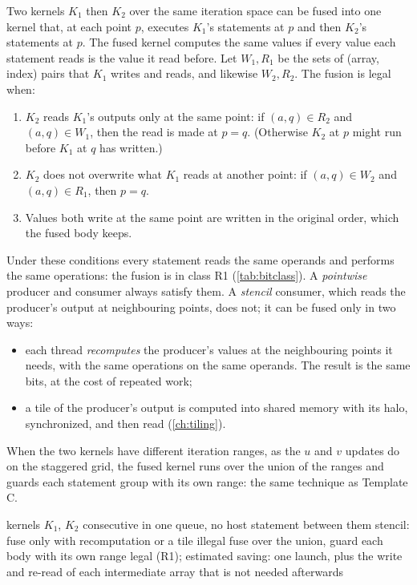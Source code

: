 Two kernels $K_1$ then $K_2$ over the same iteration space can be fused into one kernel that, at each point $p$,
executes $K_1$'s statements at $p$ and then $K_2$'s statements at $p$. The fused kernel computes the same values if
every value each statement reads is the value it read before. Let $W_1, R_1$ be the sets of (array, index) pairs that
$K_1$ writes and reads, and likewise $W_2, R_2$. The fusion is legal when:
\begin{enumerate}
  \item $K_2$ reads $K_1$'s outputs only at the same point: if $(a, q) \in R_2$ and $(a, q) \in W_1$, then the read
    is made at $p = q$. (Otherwise $K_2$ at $p$ might run before $K_1$ at $q$ has written.)
  \item $K_2$ does not overwrite what $K_1$ reads at another point: if $(a, q) \in W_2$ and $(a, q) \in R_1$, then
    $p = q$.
  \item Values both write at the same point are written in the original order, which the fused body keeps.
\end{enumerate}
Under these conditions every statement reads the same operands and performs the same operations: the fusion is in
class R1 (\cref{tab:bitclass}). A \emph{pointwise} producer and consumer always satisfy them. A \emph{stencil}
consumer, which reads the producer's output at neighbouring points, does not; it can be fused only in two ways:
\begin{itemize}
  \item each thread \emph{recomputes} the producer's values at the neighbouring points it needs, with the same
    operations on the same operands. The result is the same bits, at the cost of repeated work;
  \item a tile of the producer's output is computed into shared memory with its halo, synchronized, and then read
    (\cref{ch:tiling}).
\end{itemize}

When the two kernels have different iteration ranges, as the $u$ and $v$ updates do on the staggered grid, the fused
kernel runs over the union of the ranges and guards each statement group with its own range: the same technique as
Template C.

\begin{algorithm}[ht]
\caption{Fusion legality of two consecutive kernels (analyzer A1, on the read and write sets of the kernel bodies).}
\label{alg:fusion}
\begin{algorithmic}[1]
\Require kernels $K_1$, $K_2$ consecutive in one queue, no host statement between them
   \Return stencil: fuse only with recomputation or a tile \EndIf
\EndFor
{}
   \Return illegal \EndIf
\EndFor
{} \State fuse over the union, guard each body with its own range \EndIf
\State \Return legal (R1); estimated saving: one launch, plus the write and re-read of each intermediate array that
  is not needed afterwards
\end{algorithmic}
\end{algorithm}

